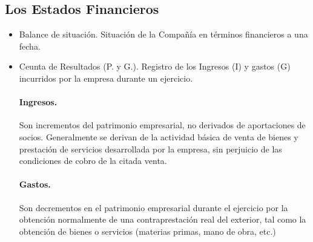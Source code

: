 \subsection{Los Estados Financieros}
\begin{itemize}
    \item Balance de situación. Situación de la Compañía en términos financieros a una fecha.
    \item Ceunta de Resultados (P. y G.). Registro de los Ingresos (I) y gastos (G) incurridos por la empresa durante un ejercicio.
    \paragraph{Ingresos.} Son incrementos del patrimonio empresarial, no derivados de aportaciones de socios. Generalmente se derivan de la actividad básica de venta de bienes y prestación de servicios desarrollada por la empresa, sin perjuicio de las condiciones de cobro de la citada venta.
    \paragraph{Gastos.} Son decrementos en el patrimonio empresarial durante el ejercicio por la obtención normalmente de una contraprestación real del exterior, tal como la obtención de bienes o servicios (materias primas, mano de obra, etc.)

\end{itemize}
